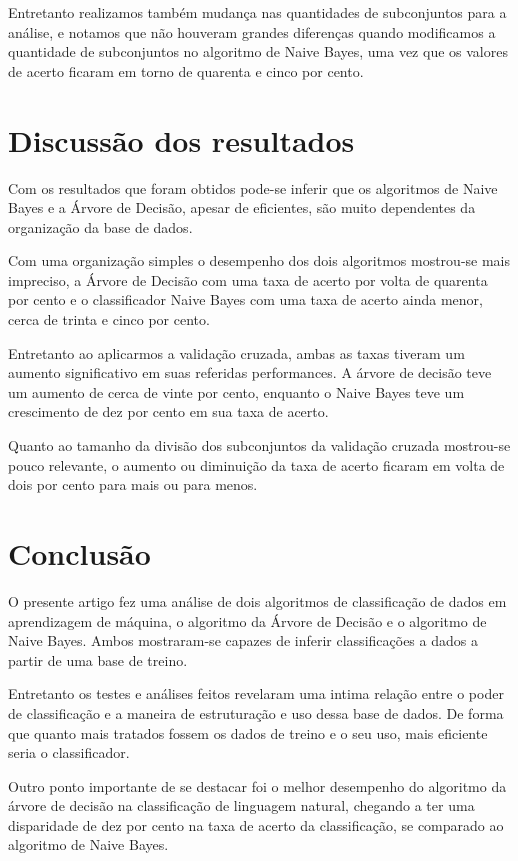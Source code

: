 \documentclass[preprint,12pt,times]{elsarticle}
\begin{document}
	Entretanto realizamos também mudança nas quantidades de subconjuntos para a análise, e notamos que não houveram grandes diferenças quando modificamos a quantidade de subconjuntos no algoritmo de Naive Bayes, uma vez que os valores de acerto ficaram em torno de quarenta e cinco por cento.
	
	\section{Discussão dos resultados}
	\label{Discussão dos resultados}
	
	Com os resultados que foram obtidos pode-se inferir que os algoritmos de Naive Bayes e a Árvore de Decisão, apesar de eficientes, são muito dependentes da organização da base de dados.
	
	Com uma organização simples o desempenho dos dois algoritmos mostrou-se mais impreciso, a Árvore de Decisão com uma taxa de acerto por volta de quarenta por cento e o classificador Naive Bayes com uma taxa de acerto ainda menor, cerca de trinta e cinco por cento.
	
	Entretanto ao aplicarmos a validação cruzada, ambas as taxas tiveram um aumento significativo em suas referidas performances. A árvore de decisão teve um aumento de cerca de vinte por cento, enquanto o Naive Bayes teve um crescimento de dez por cento em sua taxa de acerto.
	
	Quanto ao tamanho da divisão dos subconjuntos da validação cruzada mostrou-se pouco relevante, o aumento ou diminuição da taxa de acerto ficaram em volta de dois por cento para mais ou para menos. 
	
	\section{Conclusão}
	\label{Conclusão}
	O presente artigo fez uma análise de dois algoritmos de classificação de dados em aprendizagem de máquina, o algoritmo da Árvore de Decisão e o algoritmo de Naive Bayes. Ambos mostraram-se capazes de inferir classificações a dados a partir de uma base de treino. 
	
	Entretanto os testes e análises feitos revelaram uma intima relação entre o poder de classificação e a maneira de estruturação e uso dessa base de dados. De forma que quanto mais tratados fossem os dados de treino e o seu uso, mais eficiente seria o classificador.
	
	Outro ponto importante de se destacar foi o melhor desempenho do algoritmo da árvore de decisão na classificação de linguagem natural, chegando a ter uma disparidade de dez por cento na taxa de acerto da classificação, se comparado ao algoritmo de Naive Bayes.
	
\end{document}
